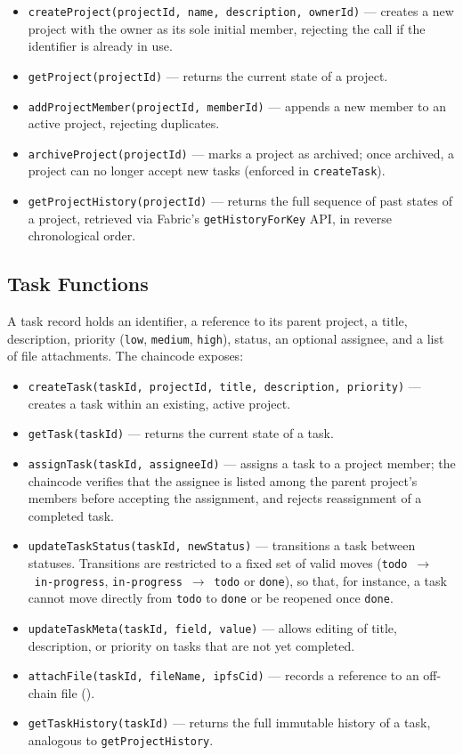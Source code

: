 \begin{itemize}
    \item \texttt{createProject(projectId, name, description, ownerId)} — creates a new project with the owner as its sole initial member, rejecting the call if the identifier is already in use.
    \item \texttt{getProject(projectId)} — returns the current state of a project.
    \item \texttt{addProjectMember(projectId, memberId)} — appends a new member to an active project, rejecting duplicates.
    \item \texttt{archiveProject(projectId)} — marks a project as archived; once archived, a project can no longer accept new tasks (enforced in \texttt{createTask}).
    \item \texttt{getProjectHistory(projectId)} — returns the full sequence of past states of a project, retrieved via Fabric's \texttt{getHistoryForKey} API, in reverse chronological order.
\end{itemize}

\subsection{Task Functions}

A task record holds an identifier, a reference to its parent project, a title, description, priority (\texttt{low}, \texttt{medium}, \texttt{high}), status, an optional assignee, and a list of file attachments. The chaincode exposes:

\begin{itemize}
    \item \texttt{createTask(taskId, projectId, title, description, priority)} — creates a task within an existing, active project.
    \item \texttt{getTask(taskId)} — returns the current state of a task.
    \item \texttt{assignTask(taskId, assigneeId)} — assigns a task to a project member; the chaincode verifies that the assignee is listed among the parent project's members before accepting the assignment, and rejects reassignment of a completed task.
    \item \texttt{updateTaskStatus(taskId, newStatus)} — transitions a task between statuses. Transitions are restricted to a fixed set of valid moves (\texttt{todo}~$\rightarrow$~\texttt{in-progress}, \texttt{in-progress}~$\rightarrow$~\texttt{todo} or \texttt{done}), so that, for instance, a task cannot move directly from \texttt{todo} to \texttt{done} or be reopened once \texttt{done}.
    \item \texttt{updateTaskMeta(taskId, field, value)} — allows editing of title, description, or priority on tasks that are not yet completed.
    \item \texttt{attachFile(taskId, fileName, ipfsCid)} — records a reference to an off-chain file ().
    \item \texttt{getTaskHistory(taskId)} — returns the full immutable history of a task, analogous to \texttt{getProjectHistory}.
\end{itemize}


